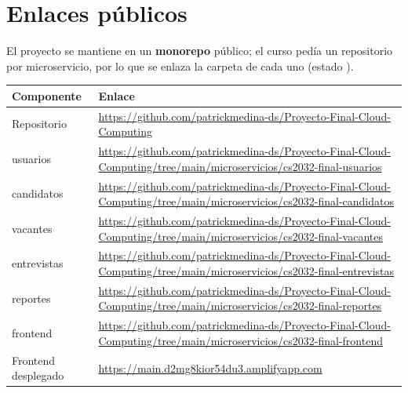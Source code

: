 \section{Enlaces públicos}
El proyecto se mantiene en un \textbf{monorepo} público; el curso pedía un repositorio por microservicio, por lo que se enlaza la carpeta de cada uno (estado \parcial).

\begin{tabular}{@{}p{3.4cm}p{10.4cm}@{}}
\toprule
Componente & Enlace \\
\midrule
Repositorio & \url{https://github.com/patrickmedina-ds/Proyecto-Final-Cloud-Computing} \\
usuarios & \url{https://github.com/patrickmedina-ds/Proyecto-Final-Cloud-Computing/tree/main/microservicios/cs2032-final-usuarios} \\
candidatos & \url{https://github.com/patrickmedina-ds/Proyecto-Final-Cloud-Computing/tree/main/microservicios/cs2032-final-candidatos} \\
vacantes & \url{https://github.com/patrickmedina-ds/Proyecto-Final-Cloud-Computing/tree/main/microservicios/cs2032-final-vacantes} \\
entrevistas & \url{https://github.com/patrickmedina-ds/Proyecto-Final-Cloud-Computing/tree/main/microservicios/cs2032-final-entrevistas} \\
reportes & \url{https://github.com/patrickmedina-ds/Proyecto-Final-Cloud-Computing/tree/main/microservicios/cs2032-final-reportes} \\
frontend & \url{https://github.com/patrickmedina-ds/Proyecto-Final-Cloud-Computing/tree/main/microservicios/cs2032-final-frontend} \\
Frontend desplegado & \url{https://main.d2mg8kior54du3.amplifyapp.com} \\
\bottomrule
\end{tabular}
